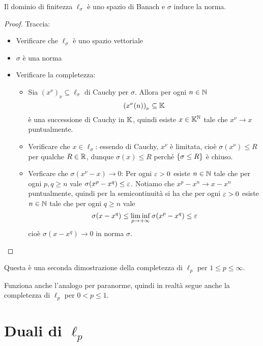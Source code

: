 \begin{exercise}
Il dominio di finitezza $\ell_\sigma$ \`e uno spazio di Banach e $\sigma$ induce la norma.
\end{exercise}
\begin{proof}
Traccia:
\begin{itemize}
    \item Verificare che $\ell_\sigma$ \`e uno spazio vettoriale
    \item $\sigma$ \`e una norma
    \item Verificare la completezza: 
    \begin{itemize}
        \item Sia $(x^\nu)_\nu\subseteq \ell_\sigma$ di Cauchy per $\sigma$. Allora per ogni $n\in\mathbb{N}$
        \[\left({x^\nu(n)}\right)_\nu\subseteq \mathbb{K}\]
        \`e una successione di Cauchy in $\mathbb{K}$, quindi esiste $x\in\mathbb{K}^{\mathbb{N}}$ tale che $x^\nu\to x$ puntualmente.
        \item Verificare che $x\in\ell_\sigma$: essendo di Cauchy, $x^\nu$ \`e limitata, cio\`e $\sigma(x^\nu)\leq R$ per qualche $R\in \mathbb{R}$, dunque $\sigma(x)\leq R$ perch\'e $\left\{{\sigma\leq R}\right\}$ \`e chiuso.
        \item Verficare che $\sigma(x^\nu-x)\to 0$: Per ogni $\varepsilon>0$ esiste $n\in\mathbb{N}$ tale che per ogni $p,q\geq n$ vale $\sigma(x^p-x^q)\leq \varepsilon$. Notiamo che $x^p-x^n\to x-x^n$ puntualmente, quindi per la semicontinuit\`a si ha che per ogni $\varepsilon>0$ esiste $n\in\mathbb{N}$ tale che per ogni $q\geq n$ vale
        \[\sigma(x-x^q)\leq\liminf_{p\to +\infty}\sigma(x^p-x^q)\leq  \varepsilon\]
        cio\`e $\sigma(x-x^q)\to 0$ in norma $\sigma$.
    \end{itemize}
\end{itemize}
\end{proof}

\begin{remark}
Questa \`e una seconda dimostrazione della completezza di $\ell_p$ per $1\leq p\leq \infty$.
\end{remark}

\begin{remark}
Funziona anche l'analogo per paranorme, quindi in realt\`a segue anche la completezza di $\ell_p$ per $0<p\leq 1$.
\end{remark}




\section{Duali di \texorpdfstring{$\ell_p$}{lp}}

